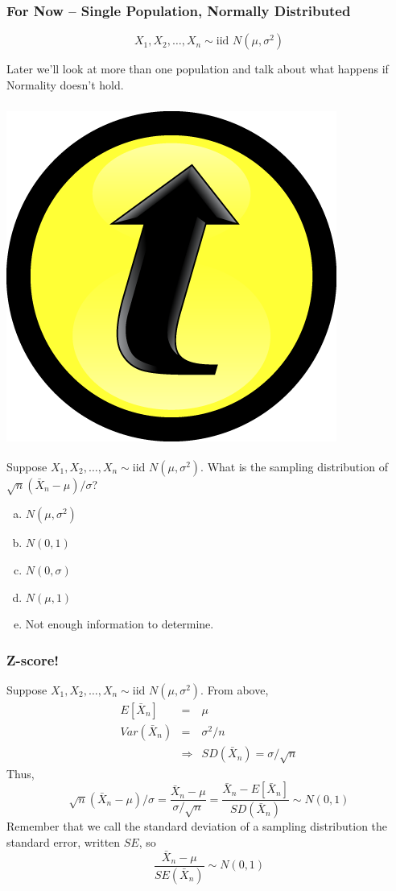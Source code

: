 \documentclass[handout]{beamer}
\begin{document}
\begin{frame}
\frametitle{For Now -- Single Population, Normally Distributed}
\Large
$$\boxed{X_1, X_2, \hdots, X_n\sim \mbox{iid } N(\mu,\sigma^2)}$$


\vspace{4em}
\normalsize
\alert{Later we'll look at more than one population and talk about what happens if Normality doesn't hold.}
\end{frame}

\begin{frame}
\frametitle{\includegraphics[scale = 0.05]{./images/clicker}}
Suppose $X_1, X_2, \hdots, X_n \sim \mbox{iid } N(\mu,\sigma^2)$. What is the sampling distribution of $\sqrt{n}(\bar{X}_n - \mu)/\sigma$?


\begin{enumerate}[(a)]
\item $N(\mu, \sigma^2)$
\item $N(0,1)$
\item $N(0,\sigma)$
\item $N(\mu, 1)$
\item Not enough information to determine.
\end{enumerate}

\end{frame}

\begin{frame}
\frametitle{Z-score!}
Suppose $X_1, X_2, \hdots, X_n \sim \mbox{iid } N(\mu,\sigma^2)$. From above,
	\begin{eqnarray*}
			E[\bar{X}_n] &=& \mu\\
			Var(\bar{X}_n) &=&  \sigma^2/n\\ 
			&\Rightarrow& SD(\bar{X}_n) =\sigma/\sqrt{n}
	\end{eqnarray*} 
Thus,
	$$\sqrt{n}(\bar{X}_n - \mu)/\sigma =  \frac{\bar{X}_n - \mu}{\sigma/\sqrt{n}} =  \frac{\bar{X}_n - E[\bar{X}_n]}{SD(\bar{X}_n)}  \sim N(0,1)$$
Remember that we call the standard deviation of a sampling distribution the \alert{standard error}, written $SE$, so $$\frac{\bar{X}_n - \mu}{SE(\bar{X}_n)} \sim N(0,1)$$
\end{frame}
\end{document}
